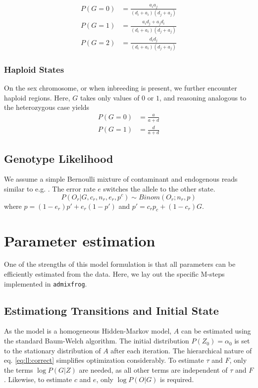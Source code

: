 \documentclass[10pt,a4paper]{article}
\begin{document}
\begin{subequations} 
\begin{align}
P(G=0) &= \frac{a_i a_j}{(d_i+a_i)(d_j+a_j)}\\
P(G=1) &= \frac{a_id_j + a_jd_i}{(d_i+a_i)(d_j+a_j)}\\
P(G=2) &= \frac{d_i d_j}{(d_i+a_i)(d_j+a_j)}
\end{align}
\end{subequations}


\subsubsection*{Haploid States}
On the sex chromosome, or when inbreeding is present, we further encounter haploid regions. Here, $G$ takes only values of $0$ or $1$, and reasoning analogous to the heterozygous case yields
\begin{subequations} 
\begin{align}
P(G=0) &= \frac{a}{a+d}\\
P(G=1) &= \frac{d}{a+d}\label{eq:ll:hap}
\end{align}
\end{subequations}
\subsection*{Genotype Likelihood}
We assume a simple Bernoulli mixture of contaminant and endogenous reads similar to e.g. \citet{racimo2016}. The error rate $e$ switches the allele to the other state.
\begin{equation}
P(O_{r}| G, c_r, n_{r}, e_r, p^{c}) \sim Binom(O_{r}; n_{r}, p) \label{eq:ll:geno}
\end{equation}
where $p = (1-e_r) p' + e_r (1-p')$
and $p' =c_{r} p_c + (1-c_{r}) G$.


\section*{Parameter estimation}
One of the strengths of this model formulation is that all parameters can be efficiently estimated from the data. Here, we lay out the specific M-steps implemented in \texttt{admixfrog}.


\subsection*{Estimationg Transitions and Initial State}
As the model is a homogeneous Hidden-Markov model, $A$ can be estimated using the standard Baum-Welch algorithm. The initial distribution $P(Z_0) = \alpha_0$ is set to the stationary distribution of $A$ after each iteration. The hierarchical nature of eq. \ref{eq:ll:correct} simplifies optimization considerably. To estimate $\tau$ and $F$, only the terms $\log P(G|Z)$ are needed, as all other terms are independent of $\tau$ and $F$. Likewise, to estimate $c$ and $e$, only $\log P(O|G)$ is required.
\end{document}
